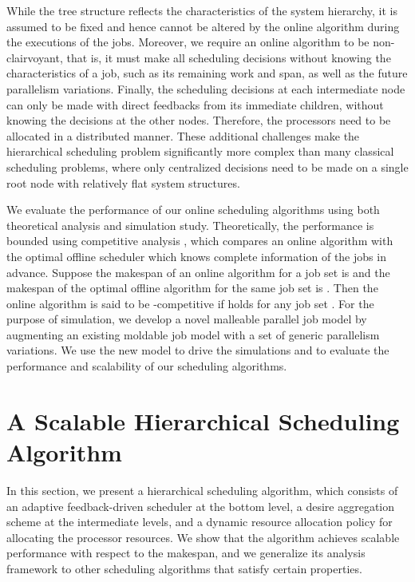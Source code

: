 \documentclass[10pt, a4paper]{article}
\begin{document}
While the tree structure reflects the characteristics of the system hierarchy, it is assumed to be
fixed and hence cannot be altered by the online algorithm during the executions of the jobs.
Moreover, we require an online algorithm to be non-clairvoyant, that is, it must make all
scheduling decisions without knowing the characteristics of a job, such as its remaining work and
span, as well as the future parallelism variations. Finally, the scheduling decisions at each
intermediate node can only be made with direct feedbacks from its immediate children, without
knowing the decisions at the other nodes. Therefore, the processors need to be allocated in a
distributed manner. These additional challenges make the hierarchical scheduling problem
significantly more complex than many classical scheduling problems, where only centralized
decisions need to be made on a single root node with relatively flat system structures.

We evaluate the performance of our online scheduling algorithms using both theoretical analysis and
simulation study. Theoretically, the performance is bounded using competitive analysis
\cite{BorodinEl98}, which compares an online algorithm with the optimal offline scheduler which
knows complete information of the jobs in advance. Suppose the makespan of an online algorithm for
a job set  is  and the makespan of the optimal offline algorithm for the same
job set is . Then the online algorithm is said to be -competitive if  holds for any job set . For the purpose of simulation, we
develop a novel malleable parallel job model by augmenting an existing moldable job model
\cite{Downey98} with a set of generic parallelism variations. We use the new model to drive the
simulations and to evaluate the performance and scalability of our scheduling algorithms.

\section{A Scalable Hierarchical Scheduling Algorithm}

In this section, we present a hierarchical scheduling algorithm, which consists of an adaptive
feedback-driven scheduler at the bottom level, a desire aggregation scheme at the intermediate
levels, and a dynamic resource allocation policy for allocating the processor resources. We show
that the algorithm achieves scalable performance with respect to the makespan, and we generalize
its analysis framework to other scheduling algorithms that satisfy certain properties.
\end{document}
